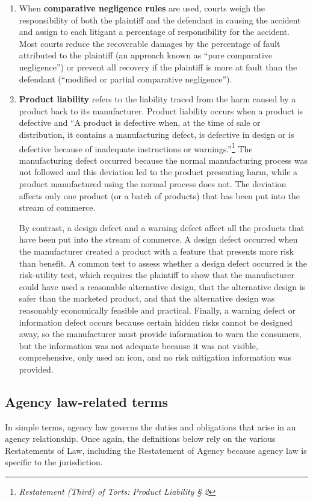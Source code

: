 \documentclass[11pt]{article}
\begin{document}
\begin{enumerate}[wide, labelindent=0pt, itemsep=0pt, topsep=1pt]
    \item[\textbullet] When \textbf{comparative negligence rules} are used, courts weigh the responsibility of both the plaintiff and the defendant in causing the accident and assign to each litigant a percentage of responsibility for the accident.  Most courts reduce the recoverable damages by the percentage of fault attributed to the plaintiff (an approach known as ``pure comparative negligence'') or prevent all recovery if the plaintiff is more at fault than the defendant (``modified or partial comparative negligence'').
    \item[\textbullet] \textbf{Product liability} refers to the liability traced from the harm caused by a product back to its manufacturer.  Product liability occurs when a product is defective and “A product is defective when, at the time of sale or distribution, it contains a manufacturing defect, is defective in design or is defective because of inadequate instructions or warnings.''\footnote{\textit{Restatement (Third) of Torts: Product Liability § 2}} The manufacturing defect occurred because the normal manufacturing process was not followed and this deviation led to the product presenting harm, while a product manufactured using the normal process does not.  The deviation affects only one product (or a batch of products) that has been put into the stream of commerce.
    
    By contrast, a design defect and a warning defect affect all the products that have been put into the stream of commerce.  A design defect occurred when the manufacturer created a product with a feature that presents more risk than benefit.  A common test to assess whether a design defect occurred is the risk-utility test, which requires the plaintiff to show that the manufacturer could have used a reasonable alternative design, that the alternative design is safer than the marketed product, and that the alternative design was reasonably economically feasible and practical.  Finally, a warning defect or information defect occurs because certain hidden risks cannot be designed away, so the manufacturer must provide information to warn the consumers, but the information was not adequate because it was not visible, comprehensive, only used an icon, and no risk mitigation information was provided.
\end{enumerate}

\subsection{Agency law-related terms}
In simple terms, agency law governs the duties and obligations that arise in an agency relationship.  Once again, the definitions below rely on the various Restatements of Law, including the Restatement of Agency \citep{rest_agency_3} because agency law is specific to the jurisdiction.
\end{document}
